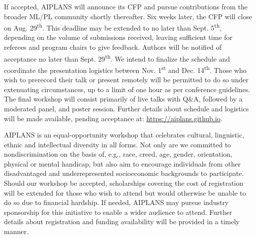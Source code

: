 \documentclass{article}
\begin{document}
If accepted, AIPLANS will announce its CFP and pursue contributions from the broader ML/PL community shortly thereafter. Six weeks later, the CFP will close on Aug. 29\textsuperscript{th}. This deadline may be extended to no later than Sept. 5\textsuperscript{th}, depending on the volume of submissions received, leaving sufficient time for referees and program chairs to give feedback. Authors will be notified of acceptance no later than Sept. 29\textsuperscript{th}. We intend to finalize the schedule and coordinate the presentation logistics between Nov. 1\textsuperscript{st} and Dec. 14\textsuperscript{th}. Those who wish to prerecord their talk or present remotely will be permitted to do so under extenuating circumstances, up to a limit of one hour as per conference guidelines. The final workshop will consist primarily of live talks with Q\&A, followed by a moderated panel, and poster session. Further details about schedule and logistics will be made available, pending acceptance at: \url{https://aiplans.github.io}.

AIPLANS is an equal-opportunity workshop that celebrates cultural, linguistic, ethnic and intellectual diversity in all forms. Not only are we committed to nondiscrimination on the basis of, e.g., race, creed, age, gender, orientation, physical or mental handicap, but also aim to encourage individuals from other disadvantaged and underrepresented socioeconomic backgrounds to participate. Should our workshop be accepted, scholarships covering the cost of registration will be extended for those who wish to attend but would otherwise be unable to do so due to financial hardship. If needed, AIPLANS may pursue industry sponsorship for this initiative to enable a wider audience to attend. Further details about registration and funding availability will be provided in a timely manner.


\newpage
\end{document}
